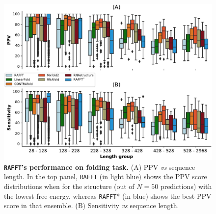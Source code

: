 \begin{figure}[t!]
	\centering
	\includegraphics[width=1.\linewidth]{../res/images/rafft/accuracy.pdf}
	\caption{\label{perf_fig} \textbf{\texttt{RAFFT}'s performance on folding task.} (A) \ac{PPV} \emph{vs} sequence length. In the top panel, \texttt{RAFFT} (in light blue) shows the \ac{PPV} score distributions when for the structure (out of $N=50$ predictions) with the lowest free energy, whereas \texttt{RAFFT}* (in blue) shows the best \ac{PPV} score in that ensemble. (B) Sensitivity \emph{vs} sequence length.}
\end{figure}

